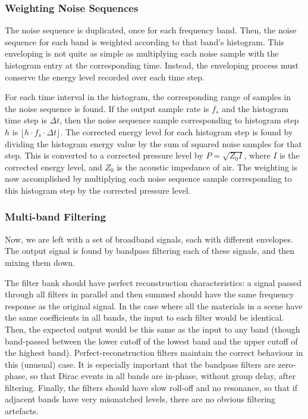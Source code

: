 \documentclass[]{scrreprt}
\begin{document}
\subsubsection{Weighting Noise
Sequences}\label{weighting-noise-sequences}

The noise sequence is duplicated, once for each frequency band. Then,
the noise sequence for each band is weighted according to that band's
histogram. This enveloping is not quite as simple as multiplying each
noise sample with the histogram entry at the corresponding time.
Instead, the enveloping process must conserve the energy level recorded
over each time step.

For each time interval in the histogram, the corresponding range of
samples in the noise sequence is found. If the output sample rate is
\(f_s\) and the histogram time step is \(\Delta t\), then the noise
sequence sample corresponding to histogram step \(h\) is
\(\lfloor h \cdot f_s \cdot \Delta t \rfloor\). The corrected energy
level for each histogram step is found by dividing the histogram energy
value by the sum of squared noise samples for that step. This is
converted to a corrected pressure level by \(P = \sqrt{Z_0 I}\), where
\(I\) is the corrected energy level, and \(Z_0\) is the acoustic
impedance of air. The weighting is now accomplished by multiplying each
noise sequence sample corresponding to this histogram step by the
corrected pressure level.

\subsubsection{Multi-band Filtering}\label{multi-band-filtering}

Now, we are left with a set of broadband signals, each with different
envelopes. The output signal is found by bandpass filtering each of
these signals, and then mixing them down.

The filter bank should have perfect reconstruction characteristics: a
signal passed through all filters in parallel and then summed should
have the same frequency response as the original signal. In the case
where all the materials in a scene have the same coefficients in all
bands, the input to each filter would be identical. Then, the expected
output would be this same as the input to any band (though band-passed
between the lower cutoff of the lowest band and the upper cutoff of the
highest band). Perfect-reconstruction filters maintain the correct
behaviour in this (unusual) case. It is especially important that the
bandpass filters are zero-phase, so that Dirac events in all bands are
in-phase, without group delay, after filtering. Finally, the filters
should have slow roll-off and no resonance, so that if adjacent bands
have very mismatched levels, there are no obvious filtering artefacts.
\end{document}
